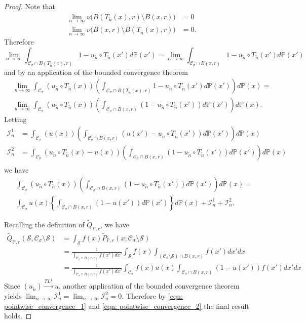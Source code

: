 \documentclass{article}
\newcommand{\1}{\mathbf{1}}
\newcommand{\Pbb}{\mathbb{P}}
\newcommand{\Sset}{\mathcal{S}}
\newcommand{\Cset}{\mathcal{C}}
\newcommand{\Csig}{\Cset_{\sigma}}
\newcommand{\wn}{\widetilde{n}}
\theoremstyle{aldenthm}
\begin{document}
\begin{proof}
	Note that
	\begin{align*}
	\lim_{n \to \infty} \nu\bigl(B(T_{\wn}(x),r) \setminus B(x,r)\bigr) & = 0 \\
	\lim_{n \to \infty} \nu\bigl(B(x,r) \setminus B(T_{\wn}(x),r)\bigr) & = 0.
	\end{align*}
	Therefore 
	\begin{equation*}
	\lim_{n \to \infty} \int_{\Csig \cap B(T_{\wn}(x),r)}  1 - u_{\wn} \circ T_{\wn}(x') d\Pbb(x') = \lim_{n \to \infty} \int_{\Csig \cap B(x,r)}  1 - u_{\wn} \circ T_{\wn}(x') d\Pbb(x')
	\end{equation*}
	and by an application of the bounded convergence theorem
	\begin{align*}
	& \lim_{n \to \infty} \int_{\Csig} \left(u_{\wn} \circ T_{\wn}(x)\right) \left(\int_{\Csig \cap B(T_{\wn}(x),r)}  1 - u_{\wn} \circ T_{\wn}(x') d\Pbb(x') \right) d\Pbb(x) = \nonumber \\
	& \lim_{n \to \infty} \int_{\Csig} \left(u_{\wn} \circ T_{\wn}(x)\right) \left(\int_{\Csig \cap B(x,r)}  \left( 1 - u_{\wn} \circ T_{\wn}(x') \right) d\Pbb(x') \right) d\Pbb(x).
	\end{align*}
	Letting
	\begin{align*}
	\mathcal{I}_n^1 & = \int_{\Csig} \left(u(x)\right) \left(\int_{\Csig \cap B(x,r)}  \left( u(x') - u_{\wn} \circ T_{\wn}(x') \right) d\Pbb(x') \right) d\Pbb(x) \\
	\mathcal{I}_n^2 & = \int_{\Csig} \left(u_{\wn} \circ T_{\wn}(x) - u(x)\right) \left(\int_{\Csig \cap B(x,r)}  \left(1 - u_{\wn} \circ T_{\wn}(x') \right) d\Pbb(x') \right) d\Pbb(x) \\
	\end{align*}
	we have
	\begin{align}
	\label{eqn: pointwise_convergence_1}
	& \int_{\Csig} \left(u_{\wn} \circ T_{\wn}(x)\right) \left(\int_{\Csig \cap B(x,r)}  \left( 1 - u_{\wn} \circ T_{\wn}(x') \right) d\Pbb(x') \right) d\Pbb(x) = \nonumber \\
	& \int_{\Csig} u(x) \left\{ \int_{\Csig \cap B(x,r)} (1 - u(x')) d\Pbb(x') \right\} d\Pbb(x) + \mathcal{I}_n^1 + \mathcal{I}_n^2. 
	\end{align}
	
	Recalling the definition of $\widetilde{Q}_{\Pbb,r}$, we have
	\begin{align}
	\label{eqn: pointwise_convergence_2}
	\widetilde{Q}_{\Pbb,r}(\Sset, \Csig \setminus \Sset) & = \int_{\Sset} f(x) \widetilde{P}_{\Pbb,r}(x; \Csig \setminus \Sset) \nonumber \\
	& = \frac{1}{\int_{\Csig \cap B(x,r)} f(x') dx'}\int_{\Sset} f(x) \int_{(\Csig \setminus \Sset) \cap B(x,r)} f(x') dx' dx \nonumber \\
	& = \frac{1}{\int_{\Csig \cap B(x,r)} f(x') dx'} \int_{\Csig} f(x) u(x){ \int_{\Csig \cap B(x,r)} (1 - u(x')) f(x') dx' }dx 
	\end{align}
	Since $(u_{\wn}) \overset{TL^1}{\to} u$, another application of the bounded convergence theorem yields $\lim_{n \to \infty} \mathcal{I}_n^1 = \lim_{n \to \infty} \mathcal{I}_n^2 = 0$. Therefore by \eqref{eqn: pointwise_convergence_1} and \eqref{eqn: pointwise_convergence_2} the final result holds.
\end{proof}
\end{document}
